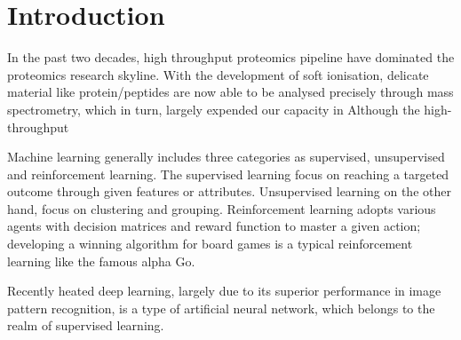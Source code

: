 \section{Introduction}

In the past two decades, high throughput proteomics pipeline have dominated the proteomics research skyline. With the development of soft ionisation, delicate material like protein/peptides are now able to be analysed precisely through mass spectrometry, which in turn, largely expended our capacity in  Although the high-throughput   
\par 
Machine learning generally includes three categories as supervised, unsupervised and reinforcement learning. The supervised learning focus on reaching a targeted outcome through given features or attributes. Unsupervised learning on the other hand, focus on clustering and grouping. Reinforcement learning adopts various agents with decision matrices and reward function to master a given action; developing a winning algorithm for board games is a typical reinforcement learning like the famous alpha Go.
\par
Recently heated deep learning, largely due to its superior performance in image pattern recognition, is a type of artificial neural network, which belongs to the realm of supervised learning. 
